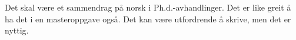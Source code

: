 \begin{sammendrag}
\markboth{}{} %
\noindent
Det skal være et sammendrag på norsk i Ph.d.-avhandlinger. Det er like greit å ha det i en masteroppgave også. Det kan være utfordrende å skrive, men det er nyttig.
\end{sammendrag}